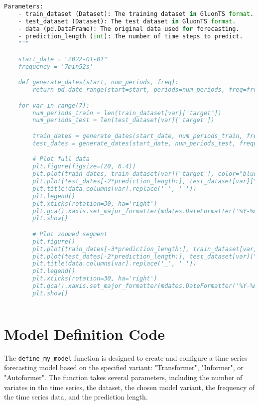 \begin{lstlisting}[language=Python, caption={Code for loading and preprocessing the time series data}, breaklines=true, label=code2]
    Parameters:
    - train_dataset (Dataset): The training dataset in GluonTS format.
    - test_dataset (Dataset): The test dataset in GluonTS format.
    - data (pd.DataFrame): The original data used for forecasting.
    - prediction_length (int): The number of time steps to predict.
    """

    start_date = "2022-01-01"
    frequency = '7min52s'

    def generate_dates(start, num_periods, freq):
        return pd.date_range(start=start, periods=num_periods, freq=freq)

    for var in range(7):
        num_periods_train = len(train_dataset[var]["target"])
        num_periods_test = len(test_dataset[var]["target"])

        train_dates = generate_dates(start_date, num_periods_train, frequency)
        test_dates = generate_dates(start_date, num_periods_test, frequency)

        # Plot full data
        plt.figure(figsize=(20, 6.4))
        plt.plot(train_dates, train_dataset[var]["target"], color="blue", label="Train")
        plt.plot(test_dates[-2*prediction_length:], test_dataset[var]["target"][-2*prediction_length:], color="red", label="Test")
        plt.title(data.columns[var].replace('_', ' '))
        plt.legend()
        plt.xticks(rotation=30, ha='right')
        plt.gca().xaxis.set_major_formatter(mdates.DateFormatter('%Y-%m-%d'))
        plt.show()

        # Plot zoomed segment
        plt.figure()
        plt.plot(train_dates[-3*prediction_length:], train_dataset[var]["target"][-3*prediction_length:], color="blue", label="Train (zoom)")
        plt.plot(test_dates[-2*prediction_length:], test_dataset[var]["target"][-2*prediction_length:], color="red", label="Test (zoom)")
        plt.title(data.columns[var].replace('_', ' '))
        plt.legend()
        plt.xticks(rotation=30, ha='right')
        plt.gca().xaxis.set_major_formatter(mdates.DateFormatter('%Y-%m-%d'))
        plt.show()
    

\end{lstlisting}

\section{Model Definition Code}

The \texttt{define\_my\_model} function is designed to create and configure a time series forecasting model based on the specified variant: "Transformer", "Informer", or "Autoformer". The function takes several parameters, including the number of variates in the time series, the dataset, the chosen model variant, the frequency of the time series data, and the prediction length.

